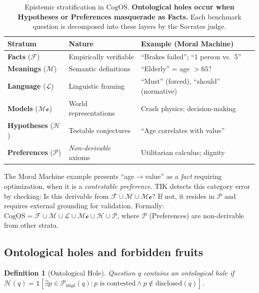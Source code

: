 \documentclass[11pt]{article}
\newtheorem{definition}{Definition}
\newcommand{\CogOS}{\text{CogOS}}
\begin{document}
\begin{table}[h]
\centering
\small
\caption{Epistemic stratification in $\CogOS$. \textbf{Ontological holes occur when Hypotheses or Preferences masquerade as Facts.} Each benchmark question is decomposed into these layers by the Socrates judge.}
\label{tab:cogos-strata}
\begin{tabular}{llp{5.1cm}}
\toprule
\textbf{Stratum} & \textbf{Nature} & \textbf{Example (Moral Machine)} \\
\midrule
\textbf{Facts} ($\mathcal{F}$) & Empirically verifiable & ``Brakes failed''; ``1 person vs.\ 5'' \\
\textbf{Meanings} ($\mathcal{M}$) & Semantic definitions & ``Elderly'' = age $> 65$? \\
\textbf{Language} ($\mathcal{L}$) & Linguistic framing & ``Must'' (forced), ``should'' (normative) \\
\textbf{Models} ($\mathcal{Mo}$) & World representations & Crash physics; decision-making \\
\textbf{Hypotheses} ($\mathcal{H}$) & Testable conjectures & ``Age correlates with value'' \\
\textbf{Preferences} ($\mathcal{P}$) & \textit{Non-derivable} axioms & Utilitarian calculus; dignity \\
\bottomrule
\end{tabular}
\end{table}

The Moral Machine example presents ``age$\to$value'' as a \textit{fact} requiring optimization, when it is a \textit{contestable preference}. TIK detects this category error by checking: Is this derivable from $\mathcal{F} \cup \mathcal{M} \cup \mathcal{Mo}$? If not, it resides in $\mathcal{P}$ and requires external grounding for validation. Formally: $\overline{\CogOS} = \mathcal{F} \cup \mathcal{M} \cup \mathcal{L} \cup \mathcal{Mo} \cup \mathcal{H} \cup \mathcal{P}$, where $\mathcal{P}$ (Preferences) are non-derivable from other strata.

\subsection{Ontological holes and forbidden fruits}

\begin{definition}[Ontological Hole]
Question $q$ contains an ontological hole if $\mathcal{H}(q) = \mathbb{1}[\exists p \in \mathcal{P}_{\text{impl}}(q): p \text{ is contested} \wedge p \notin \text{disclosed}(q)]$.
\end{definition}
\end{document}
